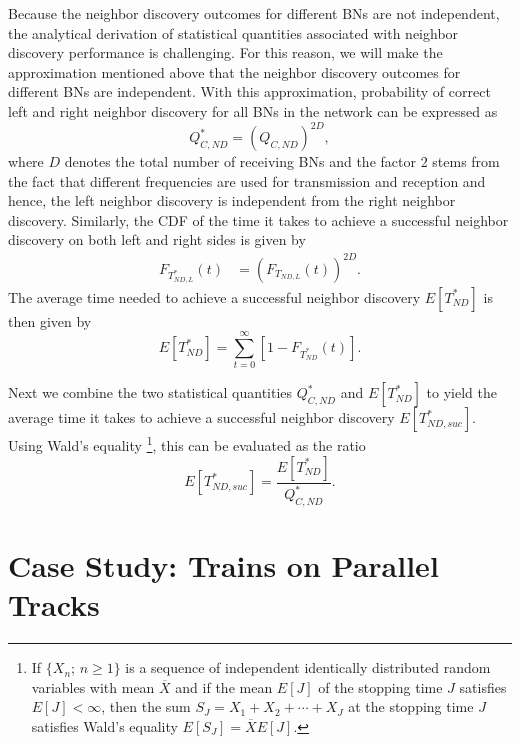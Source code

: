 \documentclass[10pt,english,two column]{IEEEtran}
\begin{document}
Because the neighbor discovery outcomes for different BNs are not
independent, the analytical derivation of statistical quantities associated
with neighbor discovery performance is challenging. For this reason,
we will make the approximation mentioned above that the neighbor discovery
outcomes for different BNs are independent. With this approximation,
probability of correct left and right neighbor discovery for all  BNs
in the network can be expressed as 
\begin{equation}
Q_{C,ND}^{*}=\left(Q_{C,ND}\right)^{2D},\label{eq:PCN}
\end{equation}
where $D$ denotes the total number of receiving BNs and the factor
$2$ stems from the fact that different frequencies are used for transmission
and reception and hence, the left neighbor discovery is independent
from the right neighbor discovery. Similarly, the CDF of the time
it takes to achieve a successful neighbor discovery on both left and
right sides is given by 
\begin{align}
F_{T_{ND,L}^{*}}\left(t\right) & =\left(F_{T_{ND,L}}\left(t\right)\right)^{2D}.\label{eq:CDF_T_L}
\end{align}
The average time needed to achieve a successful neighbor discovery
$E[T_{ND}^{*}]$ is then given by 
\begin{equation}
E\left[T_{ND}^{*}\right]=\sum_{t=0}^{\infty}\left[1-F_{T_{ND}^{*}}(t)\right].\label{eq:AvgTime}
\end{equation}


Next we combine the two statistical quantities $Q_{C,ND}^{*}$ and
$E\left[T_{ND}^{*}\right]$ to yield the average time it takes to
achieve a successful neighbor discovery $E[T_{ND,\mathrm{\mathit{suc}}}^{*}]$.
Using Wald's equality \cite{Janssen}\footnote{If $\{X_{n};\,n\geq1\}$ is a sequence of independent identically
distributed random variables with mean $\overline{X}$ and if the
mean $E[J]$ of the stopping time $J$ satisfies $E[J]<\infty$, then
the sum $S_{J}=X_{1}+X_{2}+\cdots+X_{J}$ at the stopping time $J$
satisfies Wald's equality $E\left[S_{J}\right]=\overline{X}E\left[J\right]$. }, this can be evaluated as the ratio 
\begin{equation}
E[T_{ND,suc}^{*}]=\frac{E\left[T_{ND}^{*}\right]}{Q_{C,ND}^{*}}.\label{eq:AvgStime}
\end{equation}



\section{Case Study: Trains on Parallel Tracks\label{sec:ND-parellel_tracks}}
\end{document}
